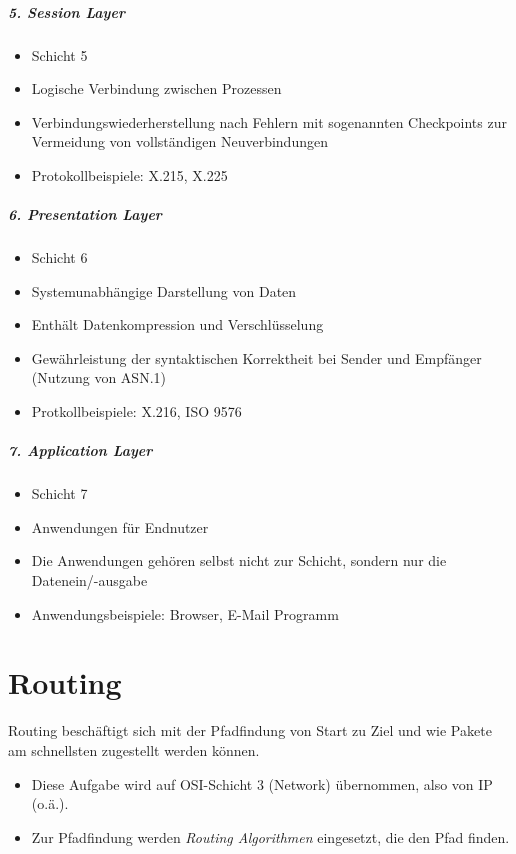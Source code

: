 	\paragraph{5. Session Layer}
		\begin{itemize}
			\item Schicht 5
			\item Logische Verbindung zwischen Prozessen
			\item Verbindungswiederherstellung nach Fehlern mit sogenannten Checkpoints zur Vermeidung von vollständigen Neuverbindungen
			\item Protokollbeispiele: X.215, X.225
		\end{itemize}

	\paragraph{6. Presentation Layer}
		\begin{itemize}
			\item Schicht 6
			\item Systemunabhängige Darstellung von Daten
			\item Enthält Datenkompression und Verschlüsselung
			\item Gewährleistung der syntaktischen Korrektheit bei Sender und Empfänger (Nutzung von ASN.1)
			\item Protkollbeispiele: X.216, ISO 9576
		\end{itemize}

	\paragraph{7. Application Layer}
		\begin{itemize}
			\item Schicht 7
			\item Anwendungen für Endnutzer
			\item Die Anwendungen gehören selbst nicht zur Schicht, sondern nur die Datenein/-ausgabe
			\item Anwendungsbeispiele: Browser, E-Mail Programm
		\end{itemize}

\chapter{Routing}
    Routing beschäftigt sich mit der Pfadfindung von Start zu Ziel und wie Pakete am schnellsten zugestellt werden können.
    \begin{itemize}
    	\item Diese Aufgabe wird auf OSI-Schicht 3 (Network) übernommen, also von IP (o.ä.).
    	\item Zur Pfadfindung werden \textit{Routing Algorithmen} eingesetzt, die den Pfad finden.
    \end{itemize}


